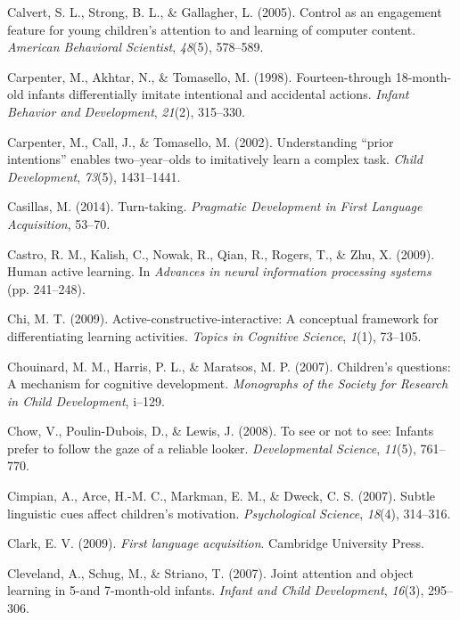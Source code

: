 \documentclass[english,floatsintext,man]{apa6}
\theoremstyle{definition}
\theoremstyle{definition}
\theoremstyle{definition}
\theoremstyle{remark}
\begin{document}
\hypertarget{ref-calvert2005control}{}
Calvert, S. L., Strong, B. L., \& Gallagher, L. (2005). Control as an
engagement feature for young children's attention to and learning of
computer content. \emph{American Behavioral Scientist}, \emph{48}(5),
578--589.

\hypertarget{ref-carpenter1998fourteen}{}
Carpenter, M., Akhtar, N., \& Tomasello, M. (1998). Fourteen-through
18-month-old infants differentially imitate intentional and accidental
actions. \emph{Infant Behavior and Development}, \emph{21}(2), 315--330.

\hypertarget{ref-carpenter2002understanding}{}
Carpenter, M., Call, J., \& Tomasello, M. (2002). Understanding ``prior
intentions'' enables two--year--olds to imitatively learn a complex
task. \emph{Child Development}, \emph{73}(5), 1431--1441.

\hypertarget{ref-casillas2014turn}{}
Casillas, M. (2014). Turn-taking. \emph{Pragmatic Development in First
Language Acquisition}, 53--70.

\hypertarget{ref-castro2009human}{}
Castro, R. M., Kalish, C., Nowak, R., Qian, R., Rogers, T., \& Zhu, X.
(2009). Human active learning. In \emph{Advances in neural information
processing systems} (pp. 241--248).

\hypertarget{ref-chi2009active}{}
Chi, M. T. (2009). Active-constructive-interactive: A conceptual
framework for differentiating learning activities. \emph{Topics in
Cognitive Science}, \emph{1}(1), 73--105.

\hypertarget{ref-chouinard2007children}{}
Chouinard, M. M., Harris, P. L., \& Maratsos, M. P. (2007). Children's
questions: A mechanism for cognitive development. \emph{Monographs of
the Society for Research in Child Development}, i--129.

\hypertarget{ref-chow2008see}{}
Chow, V., Poulin-Dubois, D., \& Lewis, J. (2008). To see or not to see:
Infants prefer to follow the gaze of a reliable looker.
\emph{Developmental Science}, \emph{11}(5), 761--770.

\hypertarget{ref-cimpian2007subtle}{}
Cimpian, A., Arce, H.-M. C., Markman, E. M., \& Dweck, C. S. (2007).
Subtle linguistic cues affect children's motivation. \emph{Psychological
Science}, \emph{18}(4), 314--316.

\hypertarget{ref-clark2009first}{}
Clark, E. V. (2009). \emph{First language acquisition}. Cambridge
University Press.

\hypertarget{ref-cleveland2007joint}{}
Cleveland, A., Schug, M., \& Striano, T. (2007). Joint attention and
object learning in 5-and 7-month-old infants. \emph{Infant and Child
Development}, \emph{16}(3), 295--306.
\end{document}
